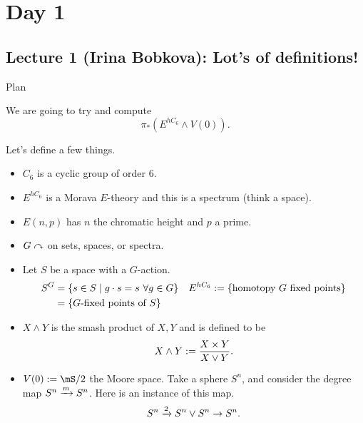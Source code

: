 \section{Day 1}

\subsection{Lecture 1 (Irina Bobkova): Lot's of definitions!}
\begin{tcolorbox}[colback = black,coltext = white]{Plan}{}

    We are going to try and compute $$\pi_\ast(E^{hC_6}\wedge V(0)).$$
\end{tcolorbox}
Let's define a few things. 
\begin{itemize}
    \item $C_6$ is a cyclic group of order 6.
    \item $E^{hC_6}$ is a Morava $E$-theory and this is a spectrum (think a space).
    \item $E(n,p)$ has $n$ the {chromatic height} and $p$ a {prime}.
    \item $G\curvearrowright$ on sets, spaces, or spectra. 
    \item Let $S$ be a space with a $G$-action. 
    \begin{align*}
        S^G&=\left\{ s\in S\mid g\cdot s = s~\forall g\in G \right\}& E^{hC_6}&:=\left\{ \text{homotopy $G$ fixed points} \right\}\\
        & = \left\{ G\text{-fixed points of }S \right\}
    \end{align*}
    \item $X\wedge Y$ is the {smash product} of $X,Y$ and is defined to be $$X\wedge Y:= \frac{X\times Y}{X\vee Y}.$$
    \item $V(0):=\mS/2$ the {Moore space}. Take a sphere $S^n$, and consider the degree map $S^n\xrightarrow{m}S^n$. Here is an instance of this map. $$S^n\xrightarrow{2}S^n\vee S^n\to S^n.$$ 
    \begin{center}
\end{center}
\end{itemize}
